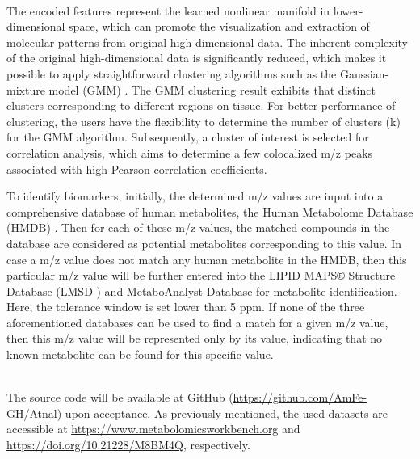 \documentclass{WileyMSP-template}
\begin{document}
 
 \\
The encoded features represent the learned nonlinear manifold in 
lower-dimensional space, which can 
promote the visualization 
and extraction of molecular patterns from original high-dimensional data.
The inherent complexity of the 
original high-dimensional data is significantly reduced, which makes 
it possible to apply straightforward clustering algorithms such 
as the Gaussian-mixture 
model (GMM) \cite{reynolds2000speaker}. The GMM clustering result exhibits that distinct 
clusters corresponding to different regions on tissue. 
For better performance of clustering, the users have the flexibility to 
determine the number of clusters (k) for the GMM algorithm. 
Subsequently, a cluster of interest is selected for correlation 
analysis, which aims to determine a few colocalized m/z 
peaks associated with high Pearson correlation coefficients. 

To identify biomarkers,  
initially, the determined m/z values are input into a 
comprehensive database of human metabolites, the Human 
Metabolome Database (HMDB) \cite{wishart2022hmdb}. 
Then for each of these m/z values, the matched compounds in the database are considered as 
potential metabolites corresponding to this value. 
In case a m/z value does not match any human metabolite in the HMDB, 
then this particular m/z value will be further 
entered into the LIPID MAPS® Structure Database 
(LMSD \cite{liebisch2020update}) and 
MetaboAnalyst Database \cite{pang2021metaboanalyst}
for metabolite identification. 
Here, the tolerance window is set lower than 5 ppm. 
If none of the three aforementioned databases 
can be used to find a match for a given m/z value, then this 
m/z 
value will be represented only by its value, 
indicating that no known metabolite can be found for this specific value. 

\\
The source code will be available 
at GitHub (\href{https://github.com/AmFe-GH/Atnal}{https://github.com/AmFe-GH/Atnal}) upon acceptance. 
As previously mentioned, the used datasets are accessible at 
\href{https://www.metabolomicsworkbench.org}{https://www.metabolomicsworkbench.org} and 
 \href{https://doi.org/10.21228/M8BM4Q}{https://doi.org/10.21228/M8BM4Q}, respectively.




\end{document}
